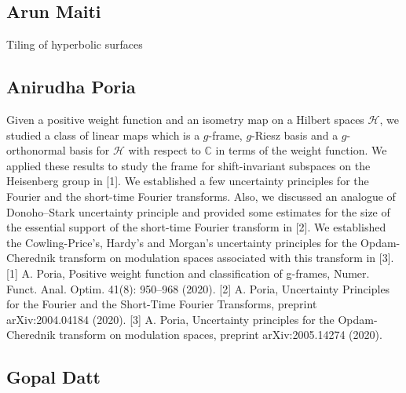 \subsection{Arun Maiti}

Tiling of hyperbolic surfaces


\subsection{Anirudha Poria}

Given a positive weight function and an isometry map on a Hilbert spaces $\mathcal{H}$, we studied a class of linear maps which is a $g$-frame, $g$-Riesz basis and a $g$-orthonormal basis for  $\mathcal{H}$ with respect to $\mathbb{C}$ in terms of the weight function. We applied these results to study the frame for shift-invariant subspaces on the Heisenberg group in [1].  We established a few uncertainty principles for the Fourier and the short-time Fourier transforms. Also, we discussed an analogue of Donoho--Stark uncertainty principle and provided some estimates for the size of the essential support of the short-time Fourier transform in  [2].  We established the Cowling-Price's, Hardy's and Morgan's uncertainty principles for the Opdam-Cherednik transform on modulation spaces associated with this transform in [3].  [1] A. Poria, Positive weight function and classification of g-frames, Numer. Funct. Anal. Optim. 41(8): 950--968 (2020).  [2] A. Poria, Uncertainty Principles for the Fourier and the Short-Time Fourier Transforms, preprint arXiv:2004.04184 (2020).  [3] A. Poria, Uncertainty principles for the Opdam-Cherednik transform on modulation spaces, preprint arXiv:2005.14274 (2020).


\subsection{Gopal Datt}

